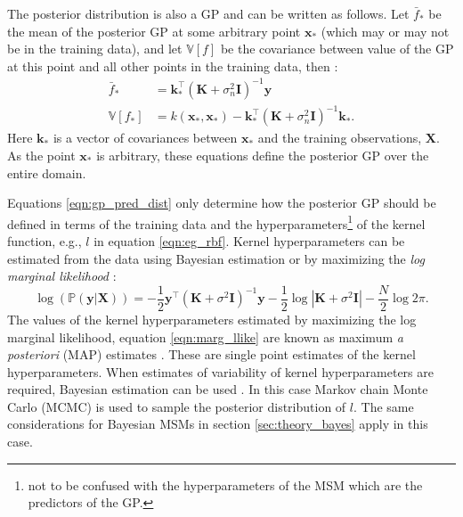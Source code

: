 The posterior distribution is also a GP and can be written as follows.  Let $\bar{f}_{*}$ be the mean of the posterior GP at some arbitrary point $\mathbf{x}_{*}$ (which may or may not be in the training data), and let $\mathbb{V}\left[f\right]$ be the covariance between value of the GP at this point and all other points in the training data, then \cite{rasmussenGaussianProcessesMachine2006}:
\begin{equation}\label{eqn:gp_pred_dist}
\begin{aligned}
\bar{f}_{*} &=\mathbf{k}_{*}^{\top}\left(\mathbf{K}+\sigma_{n}^{2} \mathbf{I}\right)^{-1} \mathbf{y} \\
\mathbb{V}\left[f_{*}\right] &=k\left(\mathbf{x}_{*}, \mathbf{x}_{*}\right)-\mathbf{k}_{*}^{\top}\left(\mathbf{K}+\sigma_{n}^{2} \mathbf{I}\right)^{-1} \mathbf{k}_{*}.
\end{aligned}
\end{equation}
Here $\mathbf{k}_{*}$ is a vector of covariances between $\mathbf{x}_{*}$ and the training observations, $\mathbf{X}$. As the point $\mathbf{x}_{*}$ is arbitrary, these equations define the posterior GP over the entire domain. 

Equations \ref{eqn:gp_pred_dist} only determine how the posterior GP should be defined in terms of the training data and the hyperparameters\footnote{not to be confused with the hyperparameters of the MSM which are the predictors of the GP.} of the kernel function, e.g., $l$ in equation \ref{eqn:eg_rbf}.  Kernel hyperparameters can be estimated from the data using Bayesian estimation or by maximizing the \emph{log marginal likelihood} \cite{rasmussenGaussianProcessesMachine2006}:
\begin{equation}\label{eqn:marg_llike}
\log{\left( \mathbb{P}(\mathbf{y} | \mathbf{X})\right)}=-\frac{1}{2} \mathbf{y}^{\top}\left(\mathbf{K}+\sigma^{2} \mathbf{I}\right)^{-1} \mathbf{y}-\frac{1}{2} \log \left|\mathbf{K}+\sigma^{2} \mathbf{I}\right|-\frac{N}{2} \log 2 \pi.
\end{equation}
The values of the kernel hyperparameters estimated by maximizing the log marginal likelihood, equation \ref{eqn:marg_llike} are known as maximum \emph{a posteriori} (MAP) estimates \cite{rasmussenGaussianProcessesMachine2006}. These are single point estimates of the kernel hyperparameters. When estimates of variability of kernel hyperparameters are required, Bayesian estimation can be used \cite{gelmanBayesianDataAnalysis2014}. In this case Markov chain Monte Carlo (MCMC) is used to sample the posterior distribution of $l$. The same considerations for Bayesian MSMs in section \ref{sec:theory_bayes} apply in this case. 

